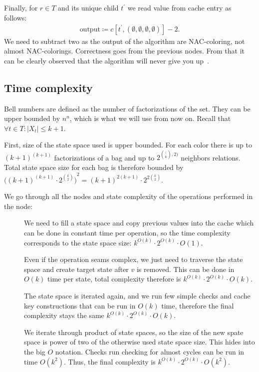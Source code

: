 \subsection{\RootNode{}}

Finally, for \( r \in T \) \RootNode{} and its unique child \( t^\prime \)
we read value from cache entry as follows:
%
\begin{align*}
	\text{output} \coloneqq c[t^\prime, (\emptyset,\emptyset,\emptyset,\emptyset)] - 2.
\end{align*}
%
We need to subtract two as the output of the algorithm are NAC-coloring,
not almost NAC-colorings. Correctness goes from the previous nodes.
From that it can be clearly observed that the algorithm
will never give you up~\cite{never_gonna_give_you_up}.

\subsection{Time complexity}

Bell numbers are defined as the number of factorizations of the set.
They can be upper bounded by \( n^n \), which is what we will use from now on.
Recall that \( \forall t \in T : |X_t| \le k+1 \).

First, size of the state space used is upper bounded.
For each color there is up to \( {(k+1)}^{(k+1)} \) factorizations of a bag and
up to \( 2^{\binom(k, 2)} \) neighbors relations.
Total state space size for each bag is therefore bounded by
\( {\big({(k+1)}^{(k+1)} \cdot 2^{\binom{k}{2}} \big)}^2 = {(k+1)}^{2(k+1)} \cdot 2^{2 \binom{k}{2}} \).

We go through all the nodes and state complexity of the operations performed in the node:
\begin{description}
	\item[\IntroduceVertexNode{}]
	      We need to fill a state space and copy previous values into the cache
	      which can be done in constant time per operation,
	      so the time complexity corresponds to the state space size:
	      \( {k}^{O(k)} \cdot 2^{O(k)} \cdot O(1) \).
	\item[\ForgetVertexNode{}]
	      Even if the operation seams complex, we just need to traverse the state space
	      and create target state after \( v \) is removed. This can be done in \( O(k) \) time
	      per state, total complexity therefore is
	      \( {k}^{O(k)} \cdot 2^{O(k)} \cdot O(k) \).
	\item[\IntroduceEdgeNode{}]
	      The state space is iterated again, and we run few simple checks and cache key constructions
	      that can be run in \( O(k) \) time, therefore the final complexity stays the same
	      \( {k}^{O(k)} \cdot 2^{O(k)} \cdot O(k) \).
	\item[\JoinNode{}]
	      We iterate through product of state spaces,
	      so the size of the new spate space is power of two
	      of the otherwise used state space size.
	      This hides into the big \( O \) notation.
	      Checks run checking for almost cycles can be run in time \( O(k^2) \).
	      Thus, the final		complexity is
	      \( {k}^{O(k)} \cdot 2^{O(k)} \cdot O(k^2) \).
\end{description}

